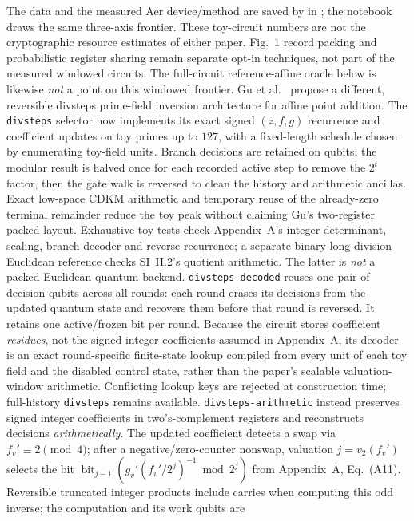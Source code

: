 \documentclass[11pt]{article}
\newcommand{\code}[1]{\texttt{#1}}
\theoremstyle{plain}
\theoremstyle{remark}
\begin{document}
The data and the measured Aer device/method are saved by
 in ; the notebook draws
the same three-axis frontier. These toy-circuit numbers are not the
cryptographic resource estimates of either paper. Fig.~1 record packing and
probabilistic register sharing remain separate opt-in techniques, not part of
the measured windowed circuits. The full-circuit reference-affine oracle
below is likewise \emph{not} a point on this windowed frontier.
Gu et al.\ \cite{ec:gu26} propose a different, reversible divsteps
prime-field inversion architecture for affine point addition. The
\code{divsteps} selector now implements its exact signed $(z,f,g)$ recurrence
and coefficient updates on toy primes up to $127$, with a fixed-length schedule
chosen by enumerating toy-field units. Branch decisions are retained on
qubits; the modular result is halved once for each recorded active step to
remove the $2^t$ factor, then the gate walk is reversed to clean the
history and arithmetic ancillas. Exact low-space CDKM arithmetic and temporary
reuse of the already-zero terminal remainder reduce the toy peak without
claiming Gu's two-register packed layout. Exhaustive toy tests check Appendix~A's
integer determinant, scaling, branch decoder and reverse recurrence; a
separate binary-long-division Euclidean reference checks SI~II.2's quotient
arithmetic. The latter is \emph{not} a packed-Euclidean quantum backend.
\code{divsteps-decoded} reuses one pair of decision qubits across all rounds:
each round erases its decisions from the updated quantum state and recovers
them before that round is reversed. It retains one active/frozen bit per
round. Because the circuit stores coefficient \emph{residues}, not the signed
integer coefficients assumed in Appendix~A, its decoder is an exact
round-specific finite-state lookup compiled from every unit of each toy
field and the disabled control state, rather than the paper's scalable
valuation-window arithmetic. Conflicting lookup keys are rejected at
construction time; full-history \code{divsteps} remains available.
\code{divsteps-arithmetic} instead preserves signed integer coefficients in
two's-complement registers and reconstructs decisions \emph{arithmetically}.
The updated coefficient detects a swap via $f_v'\equiv2\pmod4$; after a
negative/zero-counter nonswap, valuation $j=v_2(f_v')$ selects the bit
$\operatorname{bit}_{j-1}(g_v'(f_v'/2^j)^{-1}\bmod2^j)$ from
Appendix~A, Eq.~(A11). Reversible truncated integer products include carries
when computing this odd inverse; the computation and its work qubits are
\end{document}
